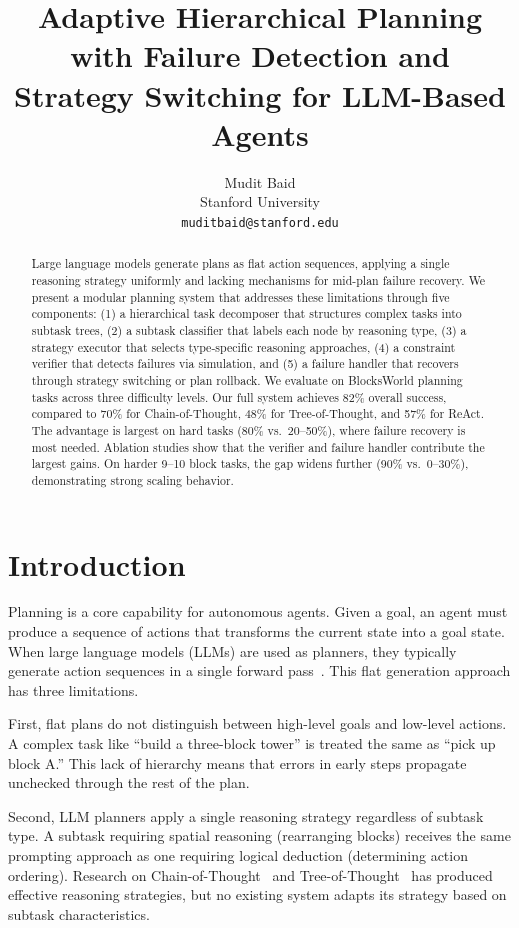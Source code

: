 \documentclass{article}
\title{Adaptive Hierarchical Planning with Failure Detection and Strategy Switching for LLM-Based Agents}
\author{
  Mudit Baid \\
  Stanford University \\
  \texttt{muditbaid@stanford.edu}
}
\begin{document}
\maketitle

\begin{abstract}
Large language models generate plans as flat action sequences, applying a single reasoning strategy uniformly and lacking mechanisms for mid-plan failure recovery. We present a modular planning system that addresses these limitations through five components: (1) a hierarchical task decomposer that structures complex tasks into subtask trees, (2) a subtask classifier that labels each node by reasoning type, (3) a strategy executor that selects type-specific reasoning approaches, (4) a constraint verifier that detects failures via simulation, and (5) a failure handler that recovers through strategy switching or plan rollback. We evaluate on BlocksWorld planning tasks across three difficulty levels. Our full system achieves 82\% overall success, compared to 70\% for Chain-of-Thought, 48\% for Tree-of-Thought, and 57\% for ReAct. The advantage is largest on hard tasks (80\% vs.\ 20--50\%), where failure recovery is most needed. Ablation studies show that the verifier and failure handler contribute the largest gains. On harder 9--10 block tasks, the gap widens further (90\% vs.\ 0--30\%), demonstrating strong scaling behavior.
\end{abstract}

\section{Introduction}

Planning is a core capability for autonomous agents. Given a goal, an agent must produce a sequence of actions that transforms the current state into a goal state. When large language models (LLMs) are used as planners, they typically generate action sequences in a single forward pass~\citep{huang2022language}. This flat generation approach has three limitations.

First, flat plans do not distinguish between high-level goals and low-level actions. A complex task like ``build a three-block tower'' is treated the same as ``pick up block A.'' This lack of hierarchy means that errors in early steps propagate unchecked through the rest of the plan.

Second, LLM planners apply a single reasoning strategy regardless of subtask type. A subtask requiring spatial reasoning (rearranging blocks) receives the same prompting approach as one requiring logical deduction (determining action ordering). Research on Chain-of-Thought~\citep{wei2022chain} and Tree-of-Thought~\citep{yao2023tree} has produced effective reasoning strategies, but no existing system adapts its strategy based on subtask characteristics.
\end{document}
